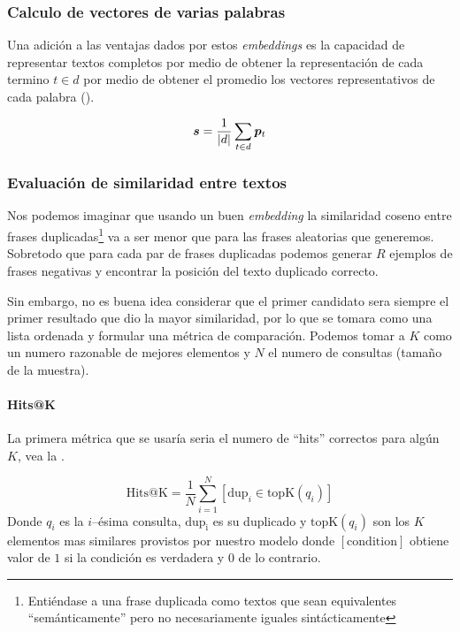 \subsubsection{Calculo de vectores de varias palabras}
Una adición a las ventajas dados por estos \emph{embeddings} es la capacidad de representar textos completos por medio de obtener la representación de cada termino $t \in d$ por medio de obtener el promedio los vectores representativos de cada palabra ().

\begin{equation} \label{eq:embeddings-sum}
  {\bm{s}} = \frac{1}{|d|} \sum_{t \in d} {\bm{p}}_{t}
\end{equation}

\subsubsection{Evaluación de similaridad entre textos}
Nos podemos imaginar que usando un buen \emph{embedding} la similaridad coseno entre frases duplicadas\footnote{Entiéndase a una frase duplicada como textos que sean equivalentes ``semánticamente'' pero no necesariamente iguales sintácticamente} va a ser menor que para las frases aleatorias que generemos. Sobretodo que para cada par de frases duplicadas podemos generar $R$ ejemplos de frases negativas y encontrar la posición del texto duplicado correcto.

Sin embargo, no es buena idea considerar que el primer candidato sera siempre el primer resultado que dio la mayor similaridad, por lo que se tomara como una lista ordenada y formular una métrica de comparación. Podemos tomar a $K$ como un numero razonable de mejores elementos y $N$ el numero de consultas (tamaño de la muestra).

\paragraph{Hits@K}
La primera métrica que se usaría seria el numero de ``hits'' correctos para algún $K$, vea la .

\begin{equation} \label{eq:hits-k}
  \mathrm{Hits@K} = \frac{1}{N} \sum_{i=1}^{N} [\mathrm{dup}_i \in \mathrm{topK}(q_i)]
\end{equation}
Donde $q_i$ es la $i$--\'esima consulta, $\mathrm{dup_i}$ es su duplicado y $\mathrm{topK}(q_i)$ son los $K$ elementos mas similares provistos por nuestro modelo donde $[\mathrm{condition}]$ obtiene valor de $1$ si la condición es verdadera y $0$ de lo contrario.

